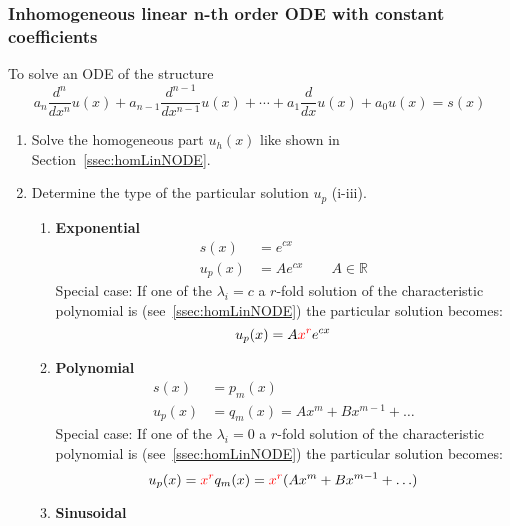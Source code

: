 \subsubsection{Inhomogeneous linear n-th order ODE with constant coefficients}
To solve an ODE of the structure
\begin{equation*}
    a_n \frac{d^n}{dx^n} u(x) + a_{n-1} \frac{d^{n-1}}{dx^{n-1}} u(x) + \cdots + a_1 \frac{d}{dx} u(x) + a_0 u(x) = s(x)
\end{equation*}
\begin{enumerate}
    \item Solve the homogeneous part $u_h(x)$ like shown in Section~\ref{ssec:homLinNODE}.
    \item Determine the type of the particular solution $u_p$ (i-iii).
          \begin{enumerate}[label= (\roman*)]
              \item \textbf{Exponential}
                    \begin{align*}
                        s(x)   & = e^{cx}                          \\
                        u_p(x) & = Ae^{cx} \qquad A \in \mathbb{R}
                    \end{align*}
                    Special case:
                    If one of the $\lambda_i = c$ a $r$-fold solution of the characteristic polynomial is (see~\ref{ssec:homLinNODE}) the particular solution becomes:
                    \begin{equation*}
                        u_p(x) = A\textcolor{red}{x^r}e^{cx}
                    \end{equation*}
              \item \textbf{Polynomial}
                    \begin{align*}
                        s(x)   & = p_m(x)                             \\
                        u_p(x) & = q_m(x) = Ax^m + Bx^{m-1} + \ldots
                    \end{align*}
                    Special case:
                    If one of the $\lambda_i = 0$ a $r$-fold solution of the characteristic polynomial is (see~\ref{ssec:homLinNODE}) the particular solution becomes:
                    \begin{equation*}
                        u_p(x)= \textcolor{red}{x^r}q_m(x) = \textcolor{red}{x^r}(Ax^m + Bx^{m-1} + \ldots)
                    \end{equation*}
              \item \textbf{Sinusoidal}

\end{enumerate}
\end{enumerate}
